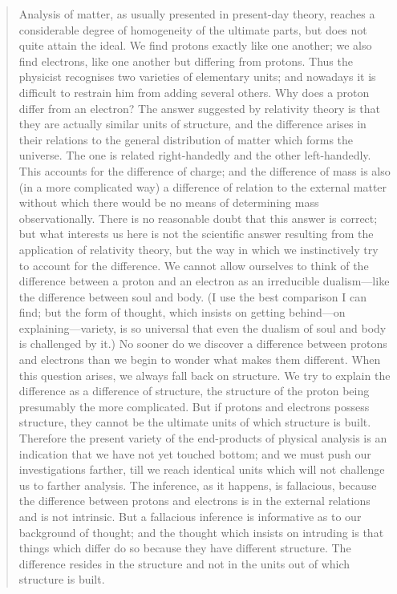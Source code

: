 \begin{quote}
    Analysis of matter, as usually presented in present-day theory, reaches a considerable degree of homogeneity of the ultimate parts, but does not quite attain the ideal.  We find protons exactly like one another; we also find electrons, like one another but differing from protons.  Thus the physicist recognises two varieties of elementary units; and nowadays it is difficult to restrain him from adding several others.  Why does a proton differ from an electron?  The answer suggested by relativity theory is that they are actually similar units of structure, and the difference arises in their relations to the general distribution of matter which forms the universe.  The one is related right-handedly and the other left-handedly.  This accounts for the difference of charge; and the difference of mass is also (in a more complicated way) a difference of relation to the external matter without which there would be no means of determining mass observationally.  There is no reasonable doubt that this answer is correct; but what interests us here is not the scientific answer resulting from the application of relativity theory, but the way in which we instinctively try to account for the difference.  We cannot allow ourselves to think of the difference between a proton and an electron as an irreducible dualism---like the difference between soul and body.  (I use the best comparison I can find; but the form of thought, which insists on getting behind---on explaining---variety, is so universal that even the dualism of soul and body is challenged by it.)  No sooner do we discover a difference between protons and electrons than we begin to wonder what makes them different.  When this question arises, we always fall back on structure.  We try to explain the difference as a difference of structure, the structure of the proton being presumably the more complicated.  But if protons and electrons possess structure, they cannot be the ultimate units of which structure is built.  Therefore the present variety of the end-products of physical analysis is an indication that we have not yet touched bottom; and we must push our investigations farther, till we reach identical units which will not challenge us to farther analysis.  The inference, as it happens, is fallacious, because the difference between protons and electrons is in the external relations and is not intrinsic.  But a fallacious inference is informative as to our background of thought; and the thought which insists on intruding is that things which differ do so because they have different structure.  The difference resides in the structure and not in the units out of which structure is built.


\end{quote}
